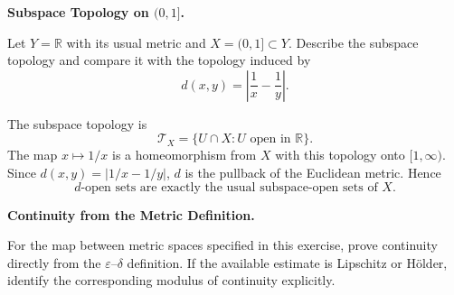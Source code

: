 \begin{problem}[CP-II-0402]
\label{prob:cp-ii-0402}
\textbf{Subspace Topology on \((0,1]\).}

\hspace*{1.5em}Let \(Y=\mathbb R\) with its usual metric and \(X=(0,1]\subset Y\). Describe the subspace topology and compare it with the topology induced by
\[
d(x,y)=\left|\frac1x-\frac1y\right|.
\]
\end{problem}

\begin{solution}
The subspace topology is
\[
\mathcal T_X=\{U\cap X:U\text{ open in }\mathbb R\}.
\]
The map \(x\mapsto1/x\) is a homeomorphism from \(X\) with this topology onto \([1,\infty)\). Since \(d(x,y)=|1/x-1/y|\), \(d\) is the pullback of the Euclidean metric. Hence
\[
\boxed{\text{\(d\)-open sets are exactly the usual subspace-open sets of }X.}
\]
\end{solution}


\begin{problem}[CP-II-0403]
\label{prob:cp-ii-0403}
\textbf{Continuity from the Metric Definition.}

\hspace*{1.5em}For the map between metric spaces specified in this exercise, prove continuity
directly from the \(\varepsilon\)--\(\delta\) definition. If the available
estimate is Lipschitz or Hölder, identify the corresponding modulus of
continuity explicitly.
\end{problem}

